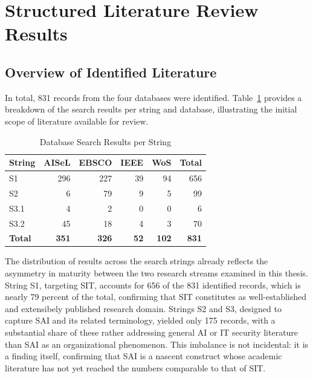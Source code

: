 \documentclass[12pt,oneside]{article}
\begin{document}
\section{Structured Literature Review Results} \label{slr-results}

\subsection{Overview of Identified Literature} \label{overview-of-identified-literature}

In total, 831 records from the four databases were identified. Table~\ref{tab:search-results} provides a breakdown of the search results per string and database, illustrating the initial scope of literature available for review.

\begin{table}[htbp]
\centering
\caption{Database Search Results per String}
\label{tab:search-results}
\begin{tabular}{@{} l rrrr r @{}}
\toprule
\textbf{String} & \textbf{AISeL} & \textbf{EBSCO} & \textbf{IEEE} & \textbf{WoS} & \textbf{Total} \\
\midrule
S1 & 296 & 227 & 39 & 94 & 656 \\
S2 &   6 &  79 &  9 &  5 &  99 \\
S3.1 &   4 &   2 &  0 &  0 &   6 \\
S3.2 &  45 &  18 &  4 &  3 &  70 \\
\midrule
\textbf{Total} & \textbf{351} & \textbf{326} & \textbf{52} & \textbf{102} & \textbf{831} \\
\bottomrule
\end{tabular}
\end{table}

The distribution of results across the search strings already reflects the asymmetry in maturity between the two research streams examined in this thesis. String S1, targeting \ac{SIT}, accounts for 656 of the 831 identified records, which is nearly 79 percent of the total, confirming that \ac{SIT} constitutes as well-established and extensibely published research domain. Strings S2 and S3, designed to capture \ac{SAI} and its related terminology, yielded only 175 records, with a substantial share of these rather addressing general \ac{AI} or \ac{IT} security literature than \ac{SAI} as an organizational phenomenon. This imbalance is not incidental: it is a finding itself, confirming that \ac{SAI} is a nascent construct whose academic literature has not yet reached the numbers comparable to that of \ac{SIT}.
\end{document}
